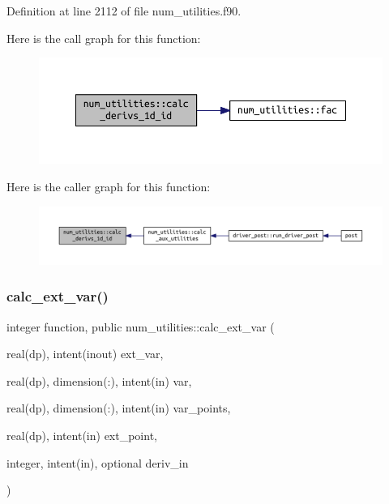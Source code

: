 Definition at line 2112 of file num\+\_\+utilities.\+f90.

Here is the call graph for this function\+:\nopagebreak
\begin{figure}[H]
\begin{center}
\leavevmode
\includegraphics[width=350pt]{namespacenum__utilities_af2e9ffd7ce2f9391bf8b6f1c344fabca_cgraph}
\end{center}
\end{figure}
Here is the caller graph for this function\+:\nopagebreak
\begin{figure}[H]
\begin{center}
\leavevmode
\includegraphics[width=350pt]{namespacenum__utilities_af2e9ffd7ce2f9391bf8b6f1c344fabca_icgraph}
\end{center}
\end{figure}
\mbox{\label{namespacenum__utilities_a2d5d9c66db19fb6edeeb50db6182397f}} 
\subsubsection{\texorpdfstring{calc\+\_\+ext\+\_\+var()}{calc\_ext\_var()}}
{\footnotesize\ttfamily integer function, public num\+\_\+utilities\+::calc\+\_\+ext\+\_\+var (\begin{DoxyParamCaption}\item[{real(dp), intent(inout)}]{ext\+\_\+var,  }\item[{real(dp), dimension(\+:), intent(in)}]{var,  }\item[{real(dp), dimension(\+:), intent(in)}]{var\+\_\+points,  }\item[{real(dp), intent(in)}]{ext\+\_\+point,  }\item[{integer, intent(in), optional}]{deriv\+\_\+in }\end{DoxyParamCaption})}



